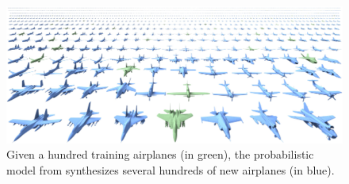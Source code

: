 \begin{figure}[t]
\centering
    \includegraphics[width=.95\columnwidth]{fig/img/kalogerakis_sig12_synthesis}
    \caption{
Given a hundred training airplanes (in green), the probabilistic model from \cite{Kalogerakis:2012:PMC} synthesizes several hundreds of new airplanes (in blue).}
    \label{fig:kalogerakis_sig12_synthesis}
\end{figure}

